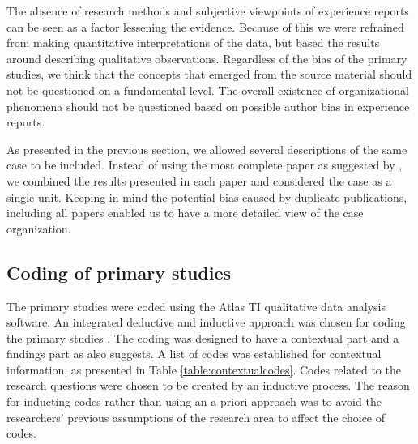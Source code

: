 The absence of research methods and subjective viewpoints of experience reports
can be seen as a factor lessening the evidence. Because of this we were
refrained from making quantitative interpretations of the data, but based the
results around describing qualitative observations. Regardless of the bias of
the primary studies, we think that the concepts that emerged from the source
material should not be questioned on a fundamental level. The overall existence
of organizational phenomena should not be questioned based on possible author
bias in experience reports.



% 

As presented in the previous section, we allowed several descriptions of the
same case to be included. Instead of using the most complete paper as suggested
by \citet{Kitchenham2007}, we combined the results presented in each
paper and considered the case as a single unit. Keeping in mind the potential
bias caused by duplicate publications, including all papers enabled us to have a
more detailed view of the case organization.


\subsection{Coding of primary studies}
\label{sec:coding}

The primary studies were coded using the Atlas TI qualitative data analysis
software. An integrated deductive and inductive approach was chosen for coding
the primary studies \citep{Cruzes2011a}. The coding was designed to have a
contextual part and a findings part as also \citet{Cruzes2011a} suggests. A list
of codes was established for contextual information, as presented in Table
\ref{table:contextualcodes}. Codes related to the research questions were chosen
to be created by an inductive process. The reason for inducting codes rather
than using an a priori approach was to avoid the researchers' previous
assumptions of the research area to affect the choice of codes.

